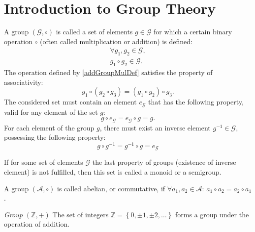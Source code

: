 \section{Introduction to Group Theory}
\label{sec:add:group}
\begin{definition}
\label{def:add:group}
A group $(\mathcal{G}, \circ)$ is called a set of elements $g \in
\mathcal{G}$ for which a
certain binary operation $\circ$ (often called multiplication or addition) is defined:
\begin{eqnarray}
\forall g_1,g_2 \in \mathcal{G},
\nonumber \\
g_1 \circ g_2 \in \mathcal{G}.
\label{addGroupMulDef}
\end{eqnarray}
The operation defined by \eqref{addGroupMulDef} satisfies the property
of associativity:
\begin{equation}
g_1 \circ \left( g_2 \circ g_3 \right ) = 
\left( g_1 \circ  g_2 \right ) \circ g_3.
\nonumber
\end{equation}
The considered set must contain an element $e_{\mathcal{G}}$ that has
the following property, valid for any element of the set $g$:
\begin{equation}
g \circ e_{\mathcal{G}} = e_{\mathcal{G}} \circ g = g.
\nonumber
\end{equation}
For each element of the group $g$, there must exist an inverse
element $g^{-1} \in \mathcal{G}$, possessing the following property:
\begin{equation}
g \circ g^{-1} = g^{-1} \circ g = e_{\mathcal{G}}
\nonumber
\end{equation} 
\end{definition}

\begin{definition}[Monoid]
\label{def:add:monoid}
If for some set of elements $\mathcal{G}$ the last property of groups (existence of inverse element)
is not fulfilled,
then this set is called a monoid or a semigroup.
\end{definition}

\begin{definition}
\label{def:add:abeliangroup}
A group $(\mathcal{A}, \circ)$ is called abelian, or commutative,
if $\forall a_1,a_2 \in \mathcal{A}$: $a_1 \circ a_2 = a_2 \circ a_1$.
\end{definition}

\begin{example}
\emph{Group $\left(\mathbb{Z}, +\right)$}
The set of integers $\mathbb{Z} = \left\{0, \pm1, \pm2,
\dots\right\}$ forms a group under the operation of addition.
\nonumber
\end{example}

